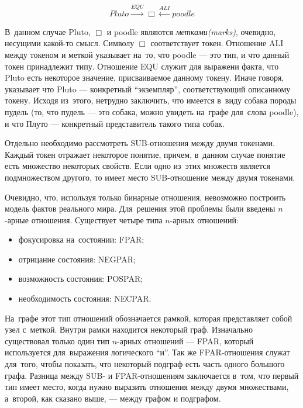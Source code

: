 $$Pluto \xrightarrow{EQU} \Box \xleftarrow{ALI} poodle $$

В~данном случае Pluto, $\Box$ и poodle являются \textsl{метками(marks)}, 
очевидно, несущими какой-то смысл. 
Символу $\Box$ соответствует токен. 
Отношение ALI между токеном и меткой указывает на~то, что poodle --- это тип,
 и что данный токен принадлежит типу. 
Отношение EQU служит для выражени факта, 
что Pluto есть некоторое значение, присваиваемое данному токену.
Иначе говоря, указывает 
что Pluto --- конкретный ``экземпляр'', соответствующий описанному токену. 
Исходя из~этого, нетрудно заключить,
что имеется в~виду собака породы пудель 
(то, что пудель --- это собака, можно увидеть на~графе для~слова  poodle), 
и что Плуто --- конкретный представитель такого типа собак.

Отдельно необходимо рассмотреть SUB-отношения между двумя токенами. 
Каждый токен отражает некоторое понятие, 
причем, в~данном случае понятие есть множество некоторых свойств. 
Если одно из~этих  множеств является подмножеством другого, 
то имеет место SUB-отношение между двумя токенами.

Очевидно, что, используя только бинарные отношения, невозможно построить модель фактов реального мира.
Для~решения этой проблемы были введены $n$-арные отношения. 
Существует четыре типа $n$-арных отношений:

\begin {itemize}

\item{
фокусировка на~состоянии: FPAR;
}

\item{
отрицание состояния: NEGPAR;
}

\item{
возможность состояния: POSPAR; 
}

\item{
необходимость состояния: NECPAR.
}

\end{itemize}

На~графе этот тип отношений обозначается рамкой, которая представляет собой  узел с~меткой. 
Внутри рамки находится некоторый граф.
Изначально существовал только один тип $n$-арных отношений --- FPAR, 
который используется для~выражения логического ``и''.
Так же FPAR-отношения служат для~того, чтобы показать, что некоторый подграф есть часть одного большого графа. 
Разница между SUB- и FPAR-отношениям заключается в~том, 
что первый тип имеет место, когда нужно выразить отношения между двумя множествами, 
а~второй, как сказано выше, --- между графом и подграфом.

